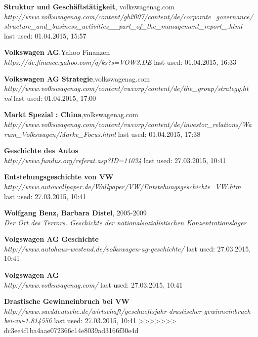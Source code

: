 \documentclass[12pt]{article}
\begin{document}
\begin{thebibliography}{56}
 \textbf{Struktur und Geschäftstätigkeit}, volkswagenag.com \\
  \textit{	http://www.volkswagenag.com/content/gb2007/content/de/corporate\_governance/structure\_and\_business\_activities\_\_part\_of\_the\_management\_report\_.html}
  \newline last used: 01.04.2015, 15:57  

 \textbf{Volkswagen AG},Yahoo Finanzen \\
  \textit{  https://de.finance.yahoo.com/q/ks?s=VOW3.DE}
  \newline last used: 01.04.2015, 16:33  
  
 \textbf{Volkswagen AG Strategie},volkswagenag.com \\
  \textit{http://www.volkswagenag.com/content/vwcorp/content/de/the\_group/strategy.html}
  \newline last used: 01.04.2015, 17:00  
    
 \textbf{Markt Spezial : China},volkswagenag.com \\
  \textit{http://www.volkswagenag.com/content/vwcorp/content/de/investor\_relations/Warum\_Volkswagen/Marke\_Focus.html
}
  \newline last used: 01.04.2015, 17:38
  
  \textbf{Geschichte des Autos} \\
  \textit{
  	  http://www.fundus.org/referat.asp?ID=11034
  }
  \newline last used: 27.03.2015, 10:41
    
\textbf{Entstehungsgeschichte von VW} \\
\textit{
http://www.autowallpaper.de/Wallpaper/VW/Entstehungsgeschichte\_VW.htm
}
\newline last used: 27.03.2015, 10:41

\textbf{Wolfgang Benz, Barbara Distel}, 2005-2009 \\
\textit{
Der Ort des Terrors. Geschichte der nationalsozialistischen Konzentrationslager
}


\textbf{Volgswagen AG Geschichte} \\
\textit{
http://www.autohaus-westend.de/volkswagen-ag-geschichte/
}
\newline last used: 27.03.2015, 10:41

\textbf{Volgswagen AG} \\
\textit{
http://www.volkswagenag.com/
}
\newline last used: 27.03.2015, 10:41

\textbf{Drastische Gewinneinbruch bei VW} \\
\textit{
http://www.sueddeutsche.de/wirtschaft/geschaeftsjahr-drastischer-gewinneinbruch-bei-vw-1.814556
}
\newline last used: 27.03.2015, 10:41  
>>>>>>> dc3ee4f1ba4aae072366c14e8039ad3166f30e4d
  
\end{thebibliography}
\end{document}
